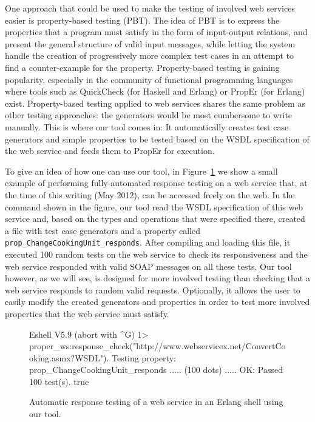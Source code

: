 \documentclass[copyright]{eptcs}
\begin{document}
One approach that could be used to make the testing of involved web
services easier is property-based testing (PBT). The idea of PBT is to
express the properties that a program must satisfy in the form of
input-output relations, and present the general structure of valid
input messages, while letting the system handle the creation of
progressively more complex test cases in an attempt to find a
counter-example for the property. Property-based testing is gaining
popularity, especially in the community of functional programming
languages where tools such as QuickCheck (for Haskell and Erlang) or
PropEr (for Erlang) exist.
%
Property-based testing applied to web services shares the same problem
as other testing approaches: the generators would be most cumbersome
to write manually. This is where our tool comes in: It automatically
creates test case generators and simple properties to be tested based
on the WSDL specification of the web service and feeds them to PropEr
for execution.

To give an idea of how one can use our tool, in
Figure~\ref{fig:response_testing} we show a small example of
performing fully-automated response testing on a web service that, at
the time of this writing (May 2012), can be accessed freely on the
web.
%
In the command shown in the figure, our tool read the WSDL
specification of this web service and, based on the types and
operations that were specified there, created a file with test case
generators and a property called
\texttt{prop\_ChangeCookingUnit\_responds}. After compiling and
loading this file, it executed 100 random tests on the web service to
check its responsiveness and the web service responded with valid SOAP
messages on all these tests. Our tool however, as we will see, is
designed for more involved testing than checking that a web service
responds to random valid requests. Optionally, it allows the user to
easily modify the created generators and properties in order to test
more involved properties that the web service must satisfy.

\begin{figure}
\begin{lstoutput}
Eshell V5.9 (abort with ^G)
1> proper_ws:response_check("http://www.webservicex.net/ConvertCooking.asmx?WSDL").
Testing property: prop_ChangeCookingUnit_responds
..... (100 dots) .....
OK: Passed 100 test(s).
true
\end{lstoutput}
\caption{Automatic response testing of a web service in an Erlang
  shell using our tool.}
\label{fig:response_testing}
\end{figure}
\end{document}
